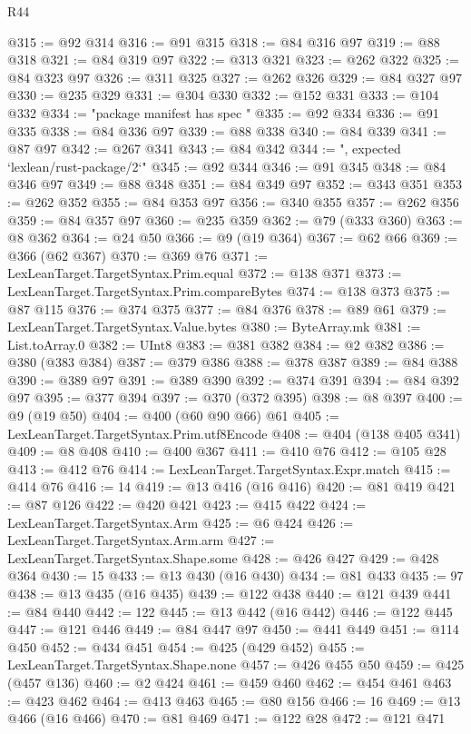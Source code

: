 \begin{lexlean}{R44}
\begin{coremodule}
@315 := @92 @314
@316 := @91 @315
@318 := @84 @316 @97
@319 := @88 @318
@321 := @84 @319 @97
@322 := @313 @321
@323 := @262 @322
@325 := @84 @323 @97
@326 := @311 @325
@327 := @262 @326
@329 := @84 @327 @97
@330 := @235 @329
@331 := @304 @330
@332 := @152 @331
@333 := @104 @332
@334 := "package manifest has spec "
@335 := @92 @334
@336 := @91 @335
@338 := @84 @336 @97
@339 := @88 @338
@340 := @84 @339
@341 := @87 @97
@342 := @267 @341
@343 := @84 @342
@344 := ", expected `lexlean/rust-package/2`"
@345 := @92 @344
@346 := @91 @345
@348 := @84 @346 @97
@349 := @88 @348
@351 := @84 @349 @97
@352 := @343 @351
@353 := @262 @352
@355 := @84 @353 @97
@356 := @340 @355
@357 := @262 @356
@359 := @84 @357 @97
@360 := @235 @359
@362 := @79 (@333 @360)
@363 := @8 @362
@364 := @24 @50
@366 := @9 (@19 @364)
@367 := @62 @66
@369 := @366 (@62 @367)
@370 := @369 @76
@371 := LexLeanTarget.TargetSyntax.Prim.equal
@372 := @138 @371
@373 := LexLeanTarget.TargetSyntax.Prim.compareBytes
@374 := @138 @373
@375 := @87 @115
@376 := @374 @375
@377 := @84 @376
@378 := @89 @61
@379 := LexLeanTarget.TargetSyntax.Value.bytes
@380 := ByteArray.mk
@381 := List.toArray.{0}
@382 := UInt8
@383 := @381 @382
@384 := @2 @382
@386 := @380 (@383 @384)
@387 := @379 @386
@388 := @378 @387
@389 := @84 @388
@390 := @389 @97
@391 := @389 @390
@392 := @374 @391
@394 := @84 @392 @97
@395 := @377 @394
@397 := @370 (@372 @395)
@398 := @8 @397
@400 := @9 (@19 @50)
@404 := @400 (@60 @90 @66) @61
@405 := LexLeanTarget.TargetSyntax.Prim.utf8Encode
@408 := @404 (@138 @405 @341)
@409 := @8 @408
@410 := @400 @367
@411 := @410 @76
@412 := @105 @28
@413 := @412 @76
@414 := LexLeanTarget.TargetSyntax.Expr.match
@415 := @414 @76
@416 := 14
@419 := @13 @416 (@16 @416)
@420 := @81 @419
@421 := @87 @126
@422 := @420 @421
@423 := @415 @422
@424 := LexLeanTarget.TargetSyntax.Arm
@425 := @6 @424
@426 := LexLeanTarget.TargetSyntax.Arm.arm
@427 := LexLeanTarget.TargetSyntax.Shape.some
@428 := @426 @427
@429 := @428 @364
@430 := 15
@433 := @13 @430 (@16 @430)
@434 := @81 @433
@435 := 97
@438 := @13 @435 (@16 @435)
@439 := @122 @438
@440 := @121 @439
@441 := @84 @440
@442 := 122
@445 := @13 @442 (@16 @442)
@446 := @122 @445
@447 := @121 @446
@449 := @84 @447 @97
@450 := @441 @449
@451 := @114 @450
@452 := @434 @451
@454 := @425 (@429 @452)
@455 := LexLeanTarget.TargetSyntax.Shape.none
@457 := @426 @455 @50
@459 := @425 (@457 @136)
@460 := @2 @424
@461 := @459 @460
@462 := @454 @461
@463 := @423 @462
@464 := @413 @463
@465 := @80 @156
@466 := 16
@469 := @13 @466 (@16 @466)
@470 := @81 @469
@471 := @122 @28
@472 := @121 @471

\end{coremodule}
\end{lexlean}
